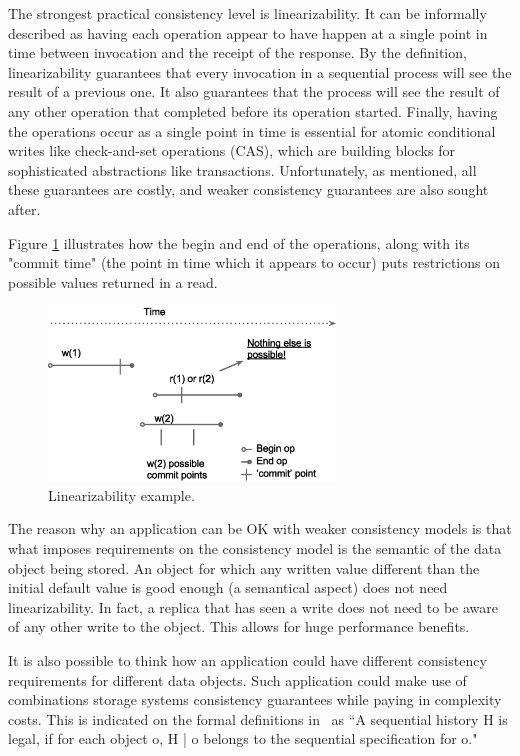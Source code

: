 \documentclass[12pt,conference]{IEEEtran}
\begin{document}
The strongest practical consistency level is linearizability. It can be informally described as having each operation appear to have happen at a single point in time between invocation and the receipt of the response. By the definition, linearizability guarantees that every invocation in a sequential process will see the result of a previous one. It also guarantees that the process will see the result of any other operation that completed before its operation started. Finally, having the operations occur as a single point in time is essential for atomic conditional writes like check-and-set operations (CAS), which are building blocks for sophisticated abstractions like transactions. Unfortunately, as mentioned, all these guarantees are costly, and weaker consistency guarantees are also sought after.

Figure \ref{linearizabilityFigure} illustrates how the begin and end of the operations, along with its "commit time" (the point in time which it appears to occur) puts restrictions on possible values returned in a read.

\begin{figure}[!t]
\centering
\includegraphics[width=3in]{images/linearizability}
\caption{Linearizability example.}
\label{linearizabilityFigure}
\end{figure}

The reason why an application can be OK with weaker consistency models is that what imposes requirements on the consistency model is the semantic of the data object being stored. An object for which any written value different than the initial default value is good enough (a semantical aspect) does not need linearizability. In fact, a replica that has seen a write does not need to be aware of any other write to the object. This allows for huge performance benefits. 

It is also possible to think how an application could have different consistency requirements for different data objects. Such application could make use of combinations storage systems consistency guarantees while paying in complexity costs. This is indicated on the formal definitions in~\cite{dziuma2013survey} as “A sequential history H is legal, if for each object o, H | o belongs to the sequential specification for o."
\end{document}
